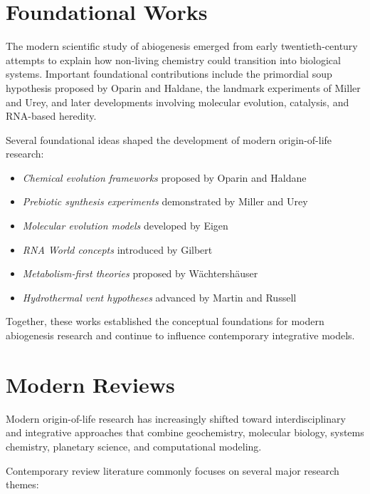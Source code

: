 \documentclass[
  oneside]{book}
\providecommand{\tightlist}{%
  \setlength{\itemsep}{0pt}\setlength{\parskip}{0pt}}
\begin{document}
\section{Foundational Works}\label{foundational-works}

The modern scientific study of abiogenesis emerged from early twentieth-century attempts to explain how non-living chemistry could transition into biological systems. Important foundational contributions include the primordial soup hypothesis proposed by Oparin and Haldane, the landmark experiments of Miller and Urey, and later developments involving molecular evolution, catalysis, and RNA-based heredity.

Several foundational ideas shaped the development of modern origin-of-life research:

\begin{itemize}
\tightlist
\item
  \emph{Chemical evolution frameworks} proposed by Oparin and Haldane
\item
  \emph{Prebiotic synthesis experiments} demonstrated by Miller and Urey
\item
  \emph{Molecular evolution models} developed by Eigen
\item
  \emph{RNA World concepts} introduced by Gilbert
\item
  \emph{Metabolism-first theories} proposed by Wächtershäuser
\item
  \emph{Hydrothermal vent hypotheses} advanced by Martin and Russell
\end{itemize}

Together, these works established the conceptual foundations for modern abiogenesis research and continue to influence contemporary integrative models.

\section{Modern Reviews}\label{modern-reviews}

Modern origin-of-life research has increasingly shifted toward interdisciplinary and integrative approaches that combine geochemistry, molecular biology, systems chemistry, planetary science, and computational modeling.

Contemporary review literature commonly focuses on several major research themes:
\end{document}
